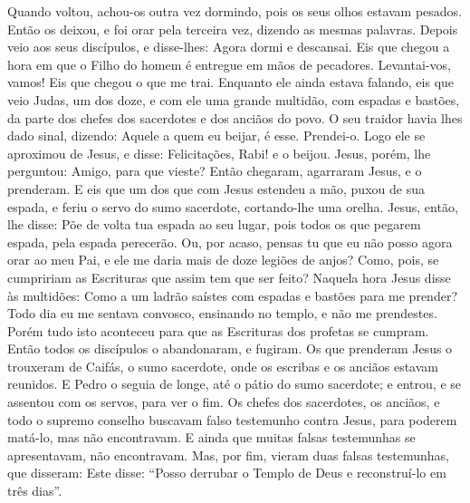 {  Quando voltou, achou-os outra vez dormindo, pois os seus olhos estavam pesados.
  Então os deixou, e foi orar pela terceira vez, dizendo as mesmas palavras.
  Depois veio aos seus discípulos, e disse-lhes: Agora dormi e descansai.
 Eis que chegou a hora em que o Filho do homem é entregue em mãos de pecadores.
  Levantai-vos, vamos! Eis que chegou o que me trai.
  Enquanto ele ainda estava falando, eis que veio Judas, um dos doze, e com ele uma grande multidão, com espadas e bastões, da parte dos chefes dos sacerdotes e dos anciãos do povo.
  O seu traidor havia lhes dado sinal, dizendo: Aquele a quem eu beijar, é esse. Prendei-o.
  Logo ele se aproximou de Jesus, e disse: Felicitações, Rabi! e o beijou.
  Jesus, porém, lhe perguntou: Amigo, para que vieste? Então chegaram, agarraram Jesus,
 e o prenderam.
  E eis que um dos que
{} com Jesus estendeu a mão, puxou de sua espada, e feriu o servo do sumo sacerdote, cortando-lhe uma orelha.
  Jesus, então, lhe disse: Põe de volta tua espada ao seu lugar, pois todos os que pegarem espada, pela espada perecerão.
  Ou, por acaso, pensas tu que eu não posso agora orar ao meu Pai, e ele me daria mais de doze legiões de anjos?
  Como, pois, se cumpririam as Escrituras
{} que assim tem que ser feito?
  Naquela hora Jesus disse às multidões: Como a um ladrão saístes com espadas e bastões para me prender? Todo dia eu me sentava convosco, ensinando no templo, e não me prendestes.
  Porém tudo isto aconteceu para que as Escrituras dos profetas se cumpram. Então todos os discípulos o abandonaram, e fugiram.
  Os que prenderam Jesus o trouxeram
{} de Caifás, o sumo sacerdote, onde os escribas e os anciãos estavam reunidos.
  E Pedro o seguia de longe, até o pátio do sumo sacerdote; e entrou, e se assentou com os servos, para ver o fim.
  Os chefes dos sacerdotes, os anciãos, e todo o supremo conselho
 buscavam falso testemunho contra Jesus, para poderem matá-lo,
  mas não encontravam. E ainda que muitas falsas testemunhas se apresentavam,
{} não encontravam.
  Mas, por fim, vieram duas falsas testemunhas, que disseram: Este disse: “Posso derrubar o Templo de Deus e reconstruí-lo em três dias”.
}
